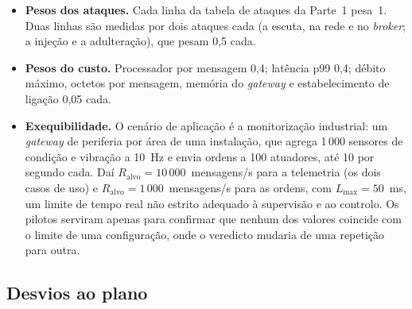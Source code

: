 \begin{itemize}[leftmargin=*]
  \item \textbf{Pesos dos ataques.} Cada linha da tabela de ataques da Parte~1
    pesa~1. Duas linhas são medidas por dois ataques cada (a escuta, na rede e no
    \emph{broker}; a injeção e a adulteração), que pesam 0,5 cada.
  \item \textbf{Pesos do custo.} Processador por mensagem 0,4; latência p99 0,4;
    débito máximo, octetos por mensagem, memória do \emph{gateway} e
    estabelecimento de ligação 0,05 cada.
  \item \textbf{Exequibilidade.} O cenário de aplicação é a monitorização
    industrial: um \emph{gateway} de periferia por área de uma instalação, que
    agrega 1\,000 sensores de condição e vibração a 10~Hz e envia ordens a 100
    atuadores, até 10 por segundo cada. Daí $R_{\text{alvo}} = 10\,000$~mensagens/s
    para a telemetria (os dois casos de uso) e $R_{\text{alvo}} = 1\,000$~mensagens/s
    para as ordens, com $L_{\max} = 50$~ms, um limite de tempo real não estrito
    adequado à supervisão e ao controlo. Os pilotos serviram apenas para confirmar
    que nenhum dos valores coincide com o limite de uma configuração, onde o
    veredicto mudaria de uma repetição para outra.
\end{itemize}

\subsection{Desvios ao plano}
\label{sec:desvios}

